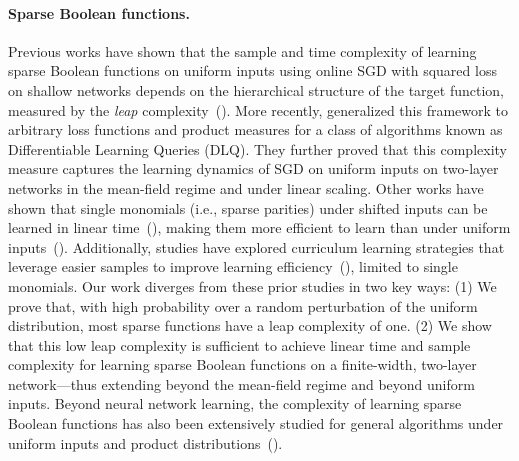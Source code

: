 




\paragraph{Sparse Boolean functions.} 
Previous works have shown that the sample and time complexity of learning sparse Boolean functions on uniform inputs using online SGD with squared loss on shallow networks depends on the hierarchical structure of the target function, measured by the \textit{leap} complexity~(\cite{abbe2022merged, abbe2023sgd}). More recently, \cite{joshi2024complexity} generalized this framework to arbitrary loss functions and product measures for a class of algorithms known as Differentiable Learning Queries (DLQ). They further proved that this complexity measure captures the learning dynamics of SGD on uniform inputs on two-layer networks in the mean-field regime and under linear scaling. Other works have shown that single monomials (i.e., sparse parities) under shifted inputs can be learned in linear time~(\cite{malach2021quantifying}), making them more efficient to learn than under uniform inputs~(\cite{AS20, shalev2014understanding}). Additionally, studies have explored curriculum learning strategies that leverage easier samples to improve learning efficiency~(\cite{cornacchia2023mathematical, abbe2023provable}), limited to single monomials. Our work diverges from these prior studies in two key ways: (1) We prove that, with high probability over a random perturbation of the uniform distribution, most sparse functions have a leap complexity of one. (2) We show that this low leap complexity is sufficient to achieve linear time and sample complexity for learning sparse Boolean functions on a finite-width, two-layer network—thus extending beyond the mean-field regime and beyond uniform inputs. Beyond neural network learning, the complexity of learning sparse Boolean functions has also been extensively studied for general algorithms under uniform inputs and product distributions~(\cite{valiant2012finding,mossel2004learning}).